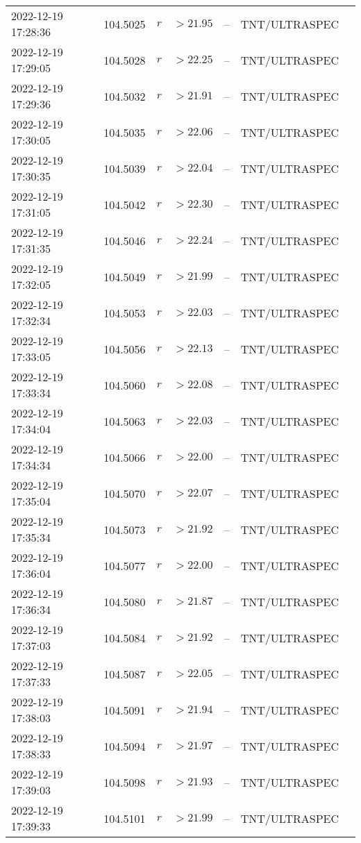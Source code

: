 \documentclass{nature_plusfigure}
\begin{document}
\begin{supplement}
\begin{center}
\begin{longtable}{lllllll}
2022-12-19 17:28:36 & 104.5025 & $r$ & $>21.95$ & -- & TNT/ULTRASPEC &  \\ 
2022-12-19 17:29:05 & 104.5028 & $r$ & $>22.25$ & -- & TNT/ULTRASPEC &  \\ 
2022-12-19 17:29:36 & 104.5032 & $r$ & $>21.91$ & -- & TNT/ULTRASPEC &  \\ 
2022-12-19 17:30:05 & 104.5035 & $r$ & $>22.06$ & -- & TNT/ULTRASPEC &  \\ 
2022-12-19 17:30:35 & 104.5039 & $r$ & $>22.04$ & -- & TNT/ULTRASPEC &  \\ 
2022-12-19 17:31:05 & 104.5042 & $r$ & $>22.30$ & -- & TNT/ULTRASPEC &  \\ 
2022-12-19 17:31:35 & 104.5046 & $r$ & $>22.24$ & -- & TNT/ULTRASPEC &  \\ 
2022-12-19 17:32:05 & 104.5049 & $r$ & $>21.99$ & -- & TNT/ULTRASPEC &  \\ 
2022-12-19 17:32:34 & 104.5053 & $r$ & $>22.03$ & -- & TNT/ULTRASPEC &  \\ 
2022-12-19 17:33:05 & 104.5056 & $r$ & $>22.13$ & -- & TNT/ULTRASPEC &  \\ 
2022-12-19 17:33:34 & 104.5060 & $r$ & $>22.08$ & -- & TNT/ULTRASPEC &  \\ 
2022-12-19 17:34:04 & 104.5063 & $r$ & $>22.03$ & -- & TNT/ULTRASPEC &  \\ 
2022-12-19 17:34:34 & 104.5066 & $r$ & $>22.00$ & -- & TNT/ULTRASPEC &  \\ 
2022-12-19 17:35:04 & 104.5070 & $r$ & $>22.07$ & -- & TNT/ULTRASPEC &  \\ 
2022-12-19 17:35:34 & 104.5073 & $r$ & $>21.92$ & -- & TNT/ULTRASPEC &  \\ 
2022-12-19 17:36:04 & 104.5077 & $r$ & $>22.00$ & -- & TNT/ULTRASPEC &  \\ 
2022-12-19 17:36:34 & 104.5080 & $r$ & $>21.87$ & -- & TNT/ULTRASPEC &  \\ 
2022-12-19 17:37:03 & 104.5084 & $r$ & $>21.92$ & -- & TNT/ULTRASPEC &  \\ 
2022-12-19 17:37:33 & 104.5087 & $r$ & $>22.05$ & -- & TNT/ULTRASPEC &  \\ 
2022-12-19 17:38:03 & 104.5091 & $r$ & $>21.94$ & -- & TNT/ULTRASPEC &  \\ 
2022-12-19 17:38:33 & 104.5094 & $r$ & $>21.97$ & -- & TNT/ULTRASPEC &  \\ 
2022-12-19 17:39:03 & 104.5098 & $r$ & $>21.93$ & -- & TNT/ULTRASPEC &  \\ 
2022-12-19 17:39:33 & 104.5101 & $r$ & $>21.99$ & -- & TNT/ULTRASPEC &  \\ 

\end{longtable}
\end{center}
\end{supplement}
\end{document}
